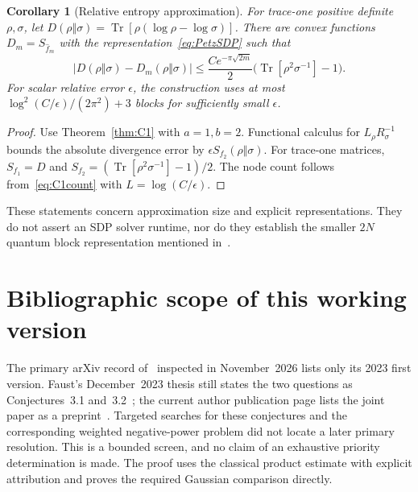 \documentclass[11pt]{article}
\newtheorem{corollary}[theorem]{Corollary}
\numberwithin{equation}{section}
\newcommand{\tr}{\operatorname{Tr}}
\begin{document}
\begin{corollary}[Relative entropy approximation]\label{cor:entropy}
For trace-one positive definite $\rho,\sigma$, let
$D(\rho\Vert\sigma)=\tr[\rho(\log\rho-\log\sigma)]$.
There are convex functions $D_m=S_{\widehat f_m}$ with the
representation~\eqref{eq:PetzSDP} such that
\begin{equation}\label{eq:entropyError}
 |D(\rho\Vert\sigma)-D_m(\rho\Vert\sigma)|
 \le\frac{C e^{-\pi\sqrt{2m}}}{2}
                  \bigl(\tr[\rho^2\sigma^{-1}]-1\bigr).
\end{equation}
For scalar relative error $\epsilon$, the construction uses at most
$\log^2(C/\epsilon)/(2\pi^2)+3$ blocks for sufficiently small $\epsilon$.
\end{corollary}

\begin{proof}
Use Theorem~\ref{thm:C1} with $a=1,b=2$. Functional calculus for
$L_\rho R_\sigma^{-1}$ bounds the absolute divergence error by
$\epsilon S_{f_2}(\rho\Vert\sigma)$. For trace-one matrices,
$S_{f_1}=D$ and $S_{f_2}=(\tr[\rho^2\sigma^{-1}]-1)/2$.
The node count follows from~\eqref{eq:C1count} with
$L=\log(C/\epsilon)$.
\end{proof}

These statements concern approximation size and explicit representations.
They do not assert an SDP solver runtime, nor do they establish the
smaller $2N$ quantum block representation mentioned in~\cite{FF}.

\section*{Bibliographic scope of this working version}

The primary arXiv record of~\cite{FF} inspected in November~2026 lists
only its 2023 first version. Faust's December~2023 thesis still states
the two questions as Conjectures~3.1 and~3.2~\cite{FaustThesis}; the
current author publication page lists the joint paper as a
preprint~\cite{FawziPage}. Targeted searches for these conjectures and
the corresponding weighted negative-power problem did not locate a
later primary resolution. This is a bounded screen, and no claim of an
exhaustive priority determination is made. The proof uses the classical
product estimate with explicit attribution and proves the required
Gaussian comparison directly.
\end{document}

